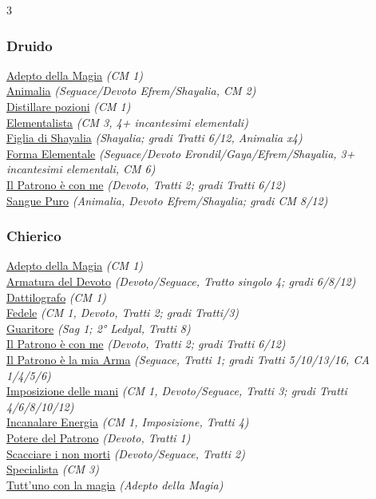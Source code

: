 \begin{multicols}{3}
{\begin{flushleft}
\subsubsection*{Druido}

\hyperlink{Adepto della Magia}{Adepto della Magia} \textit{(CM 1)}\\
\hyperlink{Animalia}{Animalia} \textit{(Seguace/Devoto Efrem/Shayalia, CM 2)}\\
\hyperlink{Distillare pozioni}{Distillare pozioni} \textit{(CM 1)}\\
\hyperlink{Elementalista}{Elementalista} \textit{(CM 3, 4+ incantesimi elementali)}\\
\hyperlink{Figlia di Shayalia}{Figlia di Shayalia} \textit{(Shayalia; gradi Tratti 6/12, Animalia x4)}\\
\hyperlink{Forma Elementale}{Forma Elementale} \textit{(Seguace/Devoto Erondil/Gaya/Efrem/Shayalia, 3+ incantesimi elementali, CM 6)}\\
\hyperlink{Il Patrono è con me}{Il Patrono è con me} \textit{(Devoto, Tratti 2; gradi Tratti 6/12)}\\
\hyperlink{Sangue Puro}{Sangue Puro} \textit{(Animalia, Devoto Efrem/Shayalia; gradi CM 8/12)}\\

\subsubsection*{Chierico}

\hyperlink{Adepto della Magia}{Adepto della Magia} \textit{(CM 1)}\\
\hyperlink{Armatura del Devoto}{Armatura del Devoto} \textit{(Devoto/Seguace, Tratto singolo 4; gradi 6/8/12)}\\
\hyperlink{Dattilografo}{Dattilografo} \textit{(CM 1)}\\
\hyperlink{Fedele}{Fedele} \textit{(CM 1, Devoto, Tratti 2; gradi Tratti/3)}\\
\hyperlink{Guaritore}{Guaritore} \textit{(Sag 1; 2° Ledyal, Tratti 8)}\\
\hyperlink{Il Patrono è con me}{Il Patrono è con me} \textit{(Devoto, Tratti 2; gradi Tratti 6/12)}\\
\hyperlink{Il Patrono è la mia Arma}{Il Patrono è la mia Arma} \textit{(Seguace, Tratti 1; gradi Tratti 5/10/13/16, CA 1/4/5/6)}\\
\hyperlink{Imposizione delle mani}{Imposizione delle mani} \textit{(CM 1, Devoto/Seguace, Tratti 3; gradi Tratti 4/6/8/10/12)}\\
\hyperlink{Incanalare Energia}{Incanalare Energia} \textit{(CM 1, Imposizione, Tratti 4)}\\
\hyperlink{Potere del Patrono}{Potere del Patrono} \textit{(Devoto, Tratti 1)}\\
\hyperlink{Scacciare i non morti}{Scacciare i non morti} \textit{(Devoto/Seguace, Tratti 2)}\\
\hyperlink{Specialista}{Specialista} \textit{(CM 3)}\\
\hyperlink{Tutt'uno con la magia}{Tutt'uno con la magia} \textit{(Adepto della Magia)}\\


\end{flushleft}}
\end{multicols}

